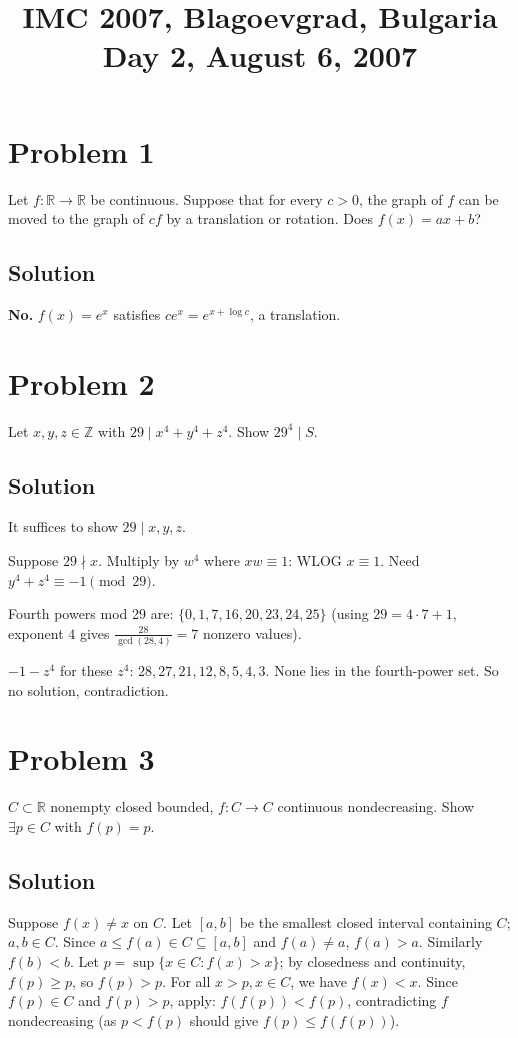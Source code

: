 \documentclass{article}
\title{IMC 2007, Blagoevgrad, Bulgaria \\ Day 2, August 6, 2007}
\date{}
\begin{document}
\maketitle

\section*{Problem 1}
Let $f : \mathbb{R} \to \mathbb{R}$ be continuous. Suppose that for every $c > 0$, the graph of $f$ can be moved to the graph of $cf$ by a translation or rotation. Does $f(x) = ax + b$?

\subsection*{Solution}
\textbf{No.} $f(x) = e^x$ satisfies $c e^x = e^{x + \log c}$, a translation.

\section*{Problem 2}
Let $x, y, z \in \mathbb{Z}$ with $29 \mid x^4 + y^4 + z^4$. Show $29^4 \mid S$.

\subsection*{Solution}
It suffices to show $29 \mid x, y, z$.

Suppose $29 \nmid x$. Multiply by $w^4$ where $xw \equiv 1$: WLOG $x \equiv 1$. Need $y^4 + z^4 \equiv -1 \pmod{29}$.

Fourth powers mod 29 are: $\{0, 1, 7, 16, 20, 23, 24, 25\}$ (using $29 = 4 \cdot 7 + 1$, exponent $4$ gives $\tfrac{28}{\gcd(28,4)} = 7$ nonzero values).

$-1 - z^4$ for these $z^4$: $28, 27, 21, 12, 8, 5, 4, 3$. None lies in the fourth-power set. So no solution, contradiction.

\section*{Problem 3}
$C \subset \mathbb{R}$ nonempty closed bounded, $f : C \to C$ continuous nondecreasing. Show $\exists p \in C$ with $f(p) = p$.

\subsection*{Solution}
Suppose $f(x) \ne x$ on $C$. Let $[a, b]$ be the smallest closed interval containing $C$; $a, b \in C$. Since $a \le f(a) \in C \subseteq [a, b]$ and $f(a) \ne a$, $f(a) > a$. Similarly $f(b) < b$. Let $p = \sup\{x \in C : f(x) > x\}$; by closedness and continuity, $f(p) \ge p$, so $f(p) > p$. For all $x > p, x \in C$, we have $f(x) < x$. Since $f(p) \in C$ and $f(p) > p$, apply: $f(f(p)) < f(p)$, contradicting $f$ nondecreasing (as $p < f(p)$ should give $f(p) \le f(f(p))$).
\end{document}
